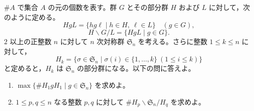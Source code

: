 \documentclass[12pt]{jlreq}
\begin{document}
\(\#A\) で集合 \(A\) の元の個数を表す。群 \(G\) とその部分群 \(H\) および \(L\) に対して，次のように定める。
\[
  HgL=\{hg\ell\mid h\in H,\ \ell\in L\}\quad (g\in G),
\]
\[
  H\backslash G/L=\{HgL\mid g\in G\}.
\]
\(2\) 以上の正整数 \(n\) に対して \(n\) 次対称群 \(\mathfrak S_n\) を考える。さらに整数 \(1\le k\le n\) に対して，
\[
  H_k=\{\sigma\in\mathfrak S_n\mid \sigma(i)\in\{1,\ldots,k\}\ (1\le i\le k)\}
\]
と定めると，\(H_k\) は \(\mathfrak S_n\) の部分群になる。以下の問に答えよ。

\begin{enumerate}
  \item \(\max\{\#H_1gH_1\mid g\in\mathfrak S_n\}\) を求めよ。
  \item \(1\le p,q\le n\) なる整数 \(p,q\) に対して \(\#H_p\backslash\mathfrak S_n/H_q\) を求めよ。
\end{enumerate}
\end{document}
